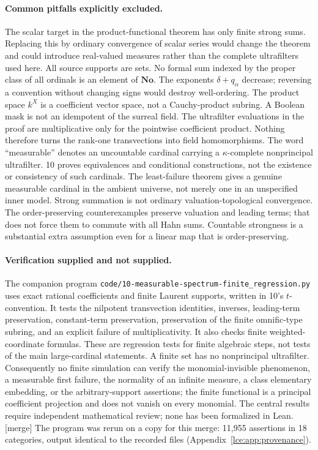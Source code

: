 \documentclass[11pt,letterpaper]{article}
\numberwithin{equation}{section}
\theoremstyle{definition}
\theoremstyle{remark}
\newcommand{\No}{\mathbf{No}}
\newcommand{\mergetag}{\textup{\textsf{\small[merge]}}}%
\newcommand{\fn}[1]{\nolinkurl{#1}}%
\begin{document}
\paragraph{Common pitfalls explicitly excluded.} The scalar target in the
product-functional theorem has only finite strong sums. Replacing this by
ordinary convergence of scalar series would change the theorem and could
introduce real-valued measures rather than the complete ultrafilters used
here. All source supports are sets. No formal sum indexed by the proper
class of all ordinals is an element of $\No$. The exponents
$\delta+q_\alpha$ decrease; reversing a convention without changing signs
would destroy well-ordering. The product space $k^X$ is a coefficient vector
space, not a Cauchy-product subring. A Boolean mask is not an idempotent of
the surreal field. The ultrafilter evaluations in the proof are
multiplicative only for the pointwise coefficient product. Nothing
therefore turns the rank-one transvections into field homomorphisms. The
word ``measurable'' denotes an uncountable cardinal carrying a
$\kappa$-complete nonprincipal ultrafilter. 10 proves equivalences and
conditional constructions, not the existence or consistency of such
cardinals. The least-failure theorem gives a genuine measurable cardinal in
the ambient universe, not merely one in an unspecified inner model. Strong
summation is not ordinary valuation-topological convergence. The
order-preserving counterexamples preserve valuation and leading terms; that
does not force them to commute with all Hahn sums. Countable strongness is a
substantial extra assumption even for a linear map that is order-preserving.

\paragraph{Verification supplied and not supplied.} The companion program
\fn{code/10-measurable-spectrum-finite_regression.py} uses exact rational
coefficients and finite Laurent supports, written in 10's $t$-convention. It
tests the nilpotent transvection identities, inverses, leading-term
preservation, constant-term preservation, preservation of the finite
omnific-type subring, and an explicit failure of multiplicativity. It also
checks finite weighted-coordinate formulas. These are regression tests for
finite algebraic steps, not tests of the main large-cardinal statements. A
finite set has no nonprincipal ultrafilter. Consequently no finite
simulation can verify the monomial-invisible phenomenon, a measurable first
failure, the normality of an infinite measure, a class elementary
embedding, or the arbitrary-support assertions; the finite functional is a
principal coefficient projection and does not vanish on every monomial.
The central results require independent mathematical review; none has been
formalized in Lean. \mergetag{} The program was rerun on a copy for this
merge: 11{,}955 assertions in 18 categories, output identical to the
recorded files (Appendix~\ref{lce:app:provenance}).
\end{document}
